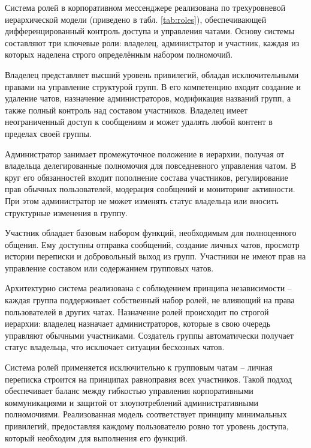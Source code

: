 Система ролей в корпоративном мессенджере реализована по трехуровневой иерархической модели (приведено в табл. \ref{tab:roles}), обеспечивающей дифференцированный контроль доступа и управления чатами. Основу системы составляют три ключевые роли: владелец, администратор и участник, каждая из которых наделена строго определённым набором полномочий.

Владелец представляет высший уровень привилегий, обладая исключительными правами на управление структурой групп. В его компетенцию входит создание и удаление чатов, назначение администраторов, модификация названий групп, а также полный контроль над составом участников. Владелец имеет неограниченный доступ к сообщениям и может удалять любой контент в пределах своей группы.

Администратор занимает промежуточное положение в иерархии, получая от владельца делегированные полномочия для повседневного управления чатом. В круг его обязанностей входит пополнение состава участников, регулирование прав обычных пользователей, модерация сообщений и мониторинг активности. При этом администратор не может изменять статус владельца или вносить структурные изменения в группу.

Участник обладает базовым набором функций, необходимым для полноценного общения. Ему доступны отправка сообщений, создание личных чатов, просмотр истории переписки и добровольный выход из групп. Участники не имеют прав на управление составом или содержанием групповых чатов.

Архитектурно система реализована с соблюдением принципа независимости – каждая группа поддерживает собственный набор ролей, не влияющий на права пользователей в других чатах. Назначение ролей происходит по строгой иерархии: владелец назначает администраторов, которые в свою очередь управляют обычными участниками. Создатель группы автоматически получает статус владельца, что исключает ситуации бесхозных чатов.

Система ролей применяется исключительно к групповым чатам – личная переписка строится на принципах равноправия всех участников. Такой подход обеспечивает баланс между гибкостью управления корпоративными коммуникациями и защитой от злоупотреблений административными полномочиями. Реализованная модель соответствует принципу минимальных привилегий, предоставляя каждому пользователю ровно тот уровень доступа, который необходим для выполнения его функций. 

